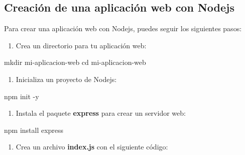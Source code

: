 \documentclass[
  a4paper,
  DIV=11,
  numbers=noendperiod,
  onepage,
  openany]{scrreprt}
\newenvironment{Shaded}{\begin{snugshade}}{\end{snugshade}}
\newcommand{\AttributeTok}[1]{\textcolor[rgb]{0.40,0.45,0.13}{#1}}
\newcommand{\BuiltInTok}[1]{\textcolor[rgb]{0.00,0.23,0.31}{#1}}
\newcommand{\ExtensionTok}[1]{\textcolor[rgb]{0.00,0.23,0.31}{#1}}
\newcommand{\FunctionTok}[1]{\textcolor[rgb]{0.28,0.35,0.67}{#1}}
\newcommand{\NormalTok}[1]{\textcolor[rgb]{0.00,0.23,0.31}{#1}}
\providecommand{\tightlist}{%
  \setlength{\itemsep}{0pt}\setlength{\parskip}{0pt}}\usepackage{longtable,booktabs,array}
\begin{document}
\begin{tcolorbox}
\section{Creación de una aplicación web con
Nodejs}\label{creaciuxf3n-de-una-aplicaciuxf3n-web-con-nodejs}

Para crear una aplicación web con Nodejs, puedes seguir los siguientes
pasos:

\begin{enumerate}
\def\labelenumi{\arabic{enumi}.}
\tightlist
\item
  Crea un directorio para tu aplicación web:
\end{enumerate}

\begin{Shaded}
\begin{Highlighting}[]
\FunctionTok{mkdir}\NormalTok{ mi{-}aplicacion{-}web}
\BuiltInTok{cd}\NormalTok{ mi{-}aplicacion{-}web}
\end{Highlighting}
\end{Shaded}

\begin{enumerate}
\def\labelenumi{\arabic{enumi}.}
\setcounter{enumi}{1}
\tightlist
\item
  Inicializa un proyecto de Nodejs:
\end{enumerate}

\begin{Shaded}
\begin{Highlighting}[]
\ExtensionTok{npm}\NormalTok{ init }\AttributeTok{{-}y}
\end{Highlighting}
\end{Shaded}

\begin{enumerate}
\def\labelenumi{\arabic{enumi}.}
\setcounter{enumi}{2}
\tightlist
\item
  Instala el paquete \textbf{express} para crear un servidor web:
\end{enumerate}

\begin{Shaded}
\begin{Highlighting}[]
\ExtensionTok{npm}\NormalTok{ install express}
\end{Highlighting}
\end{Shaded}

\begin{enumerate}
\def\labelenumi{\arabic{enumi}.}
\setcounter{enumi}{3}
\tightlist
\item
  Crea un archivo \textbf{index.js} con el siguiente código:
\end{enumerate}


\end{tcolorbox}
\end{document}
